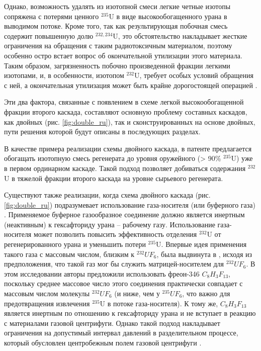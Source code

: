 Однако, возможность удалять из изотопной смеси легкие четные изотопы сопряжена с потерями ценного $^{235}$U в виде высокообогащенного урана в выводимом потоке. Кроме того, так как результирующая побочная смесь содержит повышенную долю $^{232,234}$U, это обстоятельство накладывает жесткие ограничения на обращения с таким радиотоксичным материалом, поэтому особенно остро встает вопрос об окончательной утилизации этого материала. Таким образом, загрязненность побочно произведенной фракции легкими изотопами, и, в особенности, изотопом $^{232}$U, требует особых условий обращения с ней, а окончательная утилизация может быть крайне дорогостоящей операцией \cite{smirnovApplyingEnrichmentCapacities2018}.

Эти два фактора, связанные с появлением в схеме легкой высокообогащенной фракции второго каскада, составляют основную проблему составных каскадов, как двойных (рис. \ref{fig:double_ru}), так и сконструированных на основе двойных, пути решения которой будут описаны в последующих разделах.

В качестве примера реализации схемы двойного каскада, в патенте \cite{vodolazskihSposobIzotopnogoVosstanovleniya} предлагается обогащать изотопную смесь регенерата до уровня оружейного (> 90\% $^{235}$U) уже в первом ординарном каскаде. Такой подход позволяет добиваться содержания $^{232}$U в тяжелой фракции второго каскада на уровне сырьевого регенерата.

Существуют также реализации, когда схема двойного каскада (рис. \ref{fig:double_ru}) подразумевает использование газа-носителя (или буферного газа) \cite{prusakovCorrectingIsotopicComposition2008, SposobIzotopnogoVosstanovleniyab}. Применяемое буферное газообразное соединение должно является инертным (неактивным) к гексафториду урана -- рабочему газу. Использование газа-носителя может позволить повысить эффективность отделения $^{232}$U от регенерированного урана и уменьшить потери $^{235}$U. Впервые идея применения такого газа с массовым числом, близким к $^{232}UF_6$, была выдвинута в \cite{SosninYuChelcov}, исходя из предположения, что такой газ мог бы служить матрицей-носителем для $^{232}UF_6$.
В этом исследовании авторы предложили использовать фреон-346 $C_{8}H_{3}F_{13}$, поскольку среднее массовое число этого соединения практически совпадает с массовым числом молекулы $^{232}UF_6$ (и ниже, чем у $^{235}UF_6$, что важно для предотвращения извлечения $^{235}$U в потоке газа-носителя). К тому же, $C_{8}H_{3}F_{13}$ является инертным по отношению к гексафториду урана и не вступает в реакцию с материалами газовой центрифуги. Однако такой подход накладывает ограничения на допустимый интервал давлений в разделительном процессе, который обусловлен центробежным полем газовой центрифуги \cite{prusakovCorrectingIsotopicComposition2008}.

